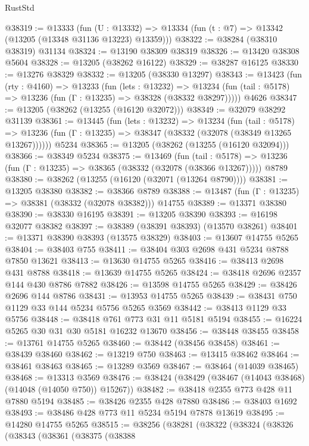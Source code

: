 \begin{lexlean}{RustStd}
\begin{coremodule}
@38319 := @13333
    (fun (U : @13332) => @13334 (fun (t : @7) => @13342 (@13205 (@13348 @31136 @13223) @13359)))
@38322 := @38284 (@38310 @38319) @31134
@38324 := @13190 @38309 @38319
@38326 := @13420 @38308 @5604
@38328 := @13205 (@38262 @16122)
@38329 := @38287 @16125
@38330 := @13276 @38329
@38332 := @13205 (@38330 @13297)
@38343 := @13423
    (fun (rty : @4160) =>
    @13233
      (fun (lets : @13232) =>
      @13234 (fun (tail : @5178) => @13236 (fun (Γ : @13235) => @38328 (@38332 @38297)))))
    @4626
@38347 := @13205 (@38262 (@13255 (@16120 @32072)))
@38349 := @32079 @38292 @31139
@38361 := @13445
    (fun (lets : @13232) =>
    @13234
      (fun (tail : @5178) =>
      @13236 (fun (Γ : @13235) => @38347 (@38332 (@32078 (@38349 @13265 @13267))))))
    @5234
@38365 := @13205 (@38262 (@13255 (@16120 @32094)))
@38366 := @38349 @5234
@38375 := @13469
    (fun (tail : @5178) => @13236 (fun (Γ : @13235) => @38365 (@38332 (@32078 (@38366 @13267)))))
    @8789
@38380 := @38262 (@13255 (@16120 (@32071 (@13264 @8790))))
@38381 := @13205 @38380
@38382 := @38366 @8789
@38388 := @13487 (fun (Γ : @13235) => @38381 (@38332 (@32078 @38382))) @14755
@38389 := @13371 @38380
@38390 := @38330 @16195
@38391 := @13205 @38390
@38393 := @16198 @32077 @38382
@38397 := @38389 (@38391 @38393) (@13570 @38261)
@38401 := @13371 @38390 @38393 (@13575 @38329)
@38403 := @13607 @14755 @5265
@38404 := @38403 @755
@38411 := @38404 @303 @2698 @431 @5234 @8788 @7850 @13621
@38413 := @13630 @14755 @5265
@38416 := @38413 @2698 @431 @8788
@38418 := @13639 @14755 @5265
@38424 := @38418 @2696 @2357 @144 @430 @8786 @7882
@38426 := @13598 @14755 @5265
@38429 := @38426 @2696 @144 @8786
@38431 := @13953 @14755 @5265
@38439 := @38431 @750 @1129 @33 @144 @5234 @5756 @5265 @3569
@38442 := @38413 @1129 @33 @5756
@38448 := @38418 @761 @773 @31 @11 @5181 @5194
@38455 := @16224 @5265 @30 @31 @30 @5181 @16232 @13670
@38456 := @38448 @38455
@38458 := @13761 @14755 @5265
@38460 := @38442 (@38456 @38458)
@38461 := @38439 @38460
@38462 := @13219 @750
@38463 := @13415 @38462
@38464 := @38461 @38463
@38465 := @13289 @3569
@38467 := @38464 (@14039 @38465)
@38468 := @13313 @3569
@38476 := @38424 (@38429 (@38467 (@14043 @38468) (@14048 (@14050 @750)) @15267))
@38482 := @38418 @2355 @773 @428 @11 @7880 @5194
@38485 := @38426 @2355 @428 @7880
@38486 := @38403 @1692
@38493 := @38486 @428 @773 @11 @5234 @5194 @7878 @13619
@38495 := @14280 @14755 @5265
@38515 := @38256
    (@38281
      (@38322
        (@38324
          (@38326
            (@38343
              (@38361
                (@38375
                  (@38388

\end{coremodule}
\end{lexlean}
